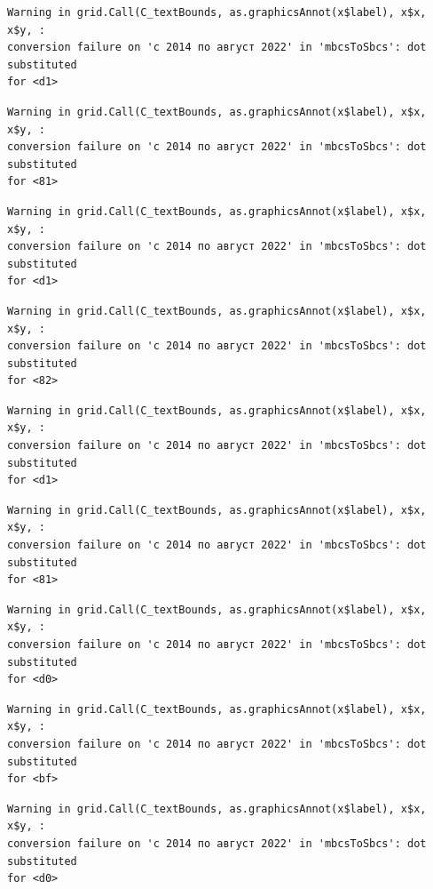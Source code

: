\documentclass[
  letterpaper,
  DIV=11,
  numbers=noendperiod]{scrartcl}
\begin{document}
\begin{verbatim}
Warning in grid.Call(C_textBounds, as.graphicsAnnot(x$label), x$x, x$y, :
conversion failure on 'с 2014 по август 2022' in 'mbcsToSbcs': dot substituted
for <d1>
\end{verbatim}

\begin{verbatim}
Warning in grid.Call(C_textBounds, as.graphicsAnnot(x$label), x$x, x$y, :
conversion failure on 'с 2014 по август 2022' in 'mbcsToSbcs': dot substituted
for <81>
\end{verbatim}

\begin{verbatim}
Warning in grid.Call(C_textBounds, as.graphicsAnnot(x$label), x$x, x$y, :
conversion failure on 'с 2014 по август 2022' in 'mbcsToSbcs': dot substituted
for <d1>
\end{verbatim}

\begin{verbatim}
Warning in grid.Call(C_textBounds, as.graphicsAnnot(x$label), x$x, x$y, :
conversion failure on 'с 2014 по август 2022' in 'mbcsToSbcs': dot substituted
for <82>
\end{verbatim}

\begin{verbatim}
Warning in grid.Call(C_textBounds, as.graphicsAnnot(x$label), x$x, x$y, :
conversion failure on 'с 2014 по август 2022' in 'mbcsToSbcs': dot substituted
for <d1>
\end{verbatim}

\begin{verbatim}
Warning in grid.Call(C_textBounds, as.graphicsAnnot(x$label), x$x, x$y, :
conversion failure on 'с 2014 по август 2022' in 'mbcsToSbcs': dot substituted
for <81>
\end{verbatim}

\begin{verbatim}
Warning in grid.Call(C_textBounds, as.graphicsAnnot(x$label), x$x, x$y, :
conversion failure on 'с 2014 по август 2022' in 'mbcsToSbcs': dot substituted
for <d0>
\end{verbatim}

\begin{verbatim}
Warning in grid.Call(C_textBounds, as.graphicsAnnot(x$label), x$x, x$y, :
conversion failure on 'с 2014 по август 2022' in 'mbcsToSbcs': dot substituted
for <bf>
\end{verbatim}

\begin{verbatim}
Warning in grid.Call(C_textBounds, as.graphicsAnnot(x$label), x$x, x$y, :
conversion failure on 'с 2014 по август 2022' in 'mbcsToSbcs': dot substituted
for <d0>
\end{verbatim}
\end{document}
